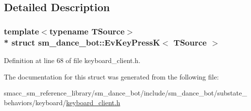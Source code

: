 \subsection{Detailed Description}
\subsubsection*{template$<$typename T\+Source$>$\\*
struct sm\+\_\+dance\+\_\+bot\+::\+Ev\+Key\+Press\+K$<$ T\+Source $>$}



Definition at line 68 of file keyboard\+\_\+client.\+h.



The documentation for this struct was generated from the following file\+:\begin{DoxyCompactItemize}
\item 
smacc\+\_\+sm\+\_\+reference\+\_\+library/sm\+\_\+dance\+\_\+bot/include/sm\+\_\+dance\+\_\+bot/substate\+\_\+behaviors/keyboard/\hyperlink{keyboard__client_8h}{keyboard\+\_\+client.\+h}\end{DoxyCompactItemize}

